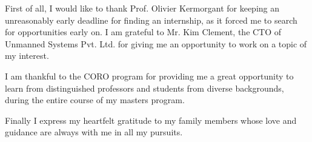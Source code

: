 First of all, I would like to thank Prof. Olivier Kermorgant for keeping an unreasonably early deadline for finding an internship, as it forced me to search for opportunities early on. I am grateful to Mr. Kim Clement, the CTO of Unmanned Systems Pvt. Ltd. for giving me an opportunity to work on a topic of my interest. 

I am thankful to the CORO program for providing me a great opportunity to learn from distinguished professors and students from diverse backgrounds, during the entire course of my masters program.

Finally I express my heartfelt gratitude to my family members whose love and guidance are always with me in all my pursuits. 
